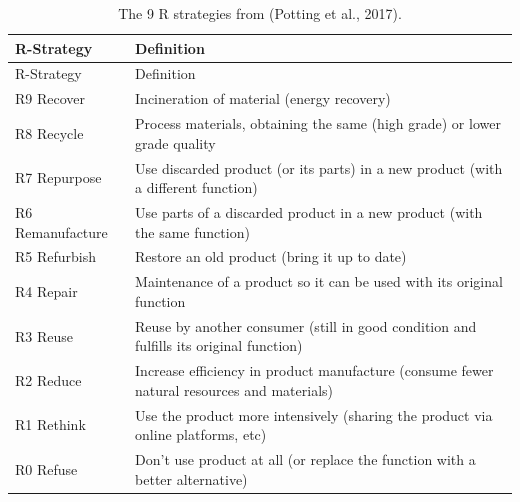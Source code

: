 \documentclass[
  12pt,
  letterpaper,
  DIV=11,
  numbers=noendperiod]{scrartcl}
\begin{document}
\begin{longtable}[]{@{}
  >{\raggedright\arraybackslash}p{}
  >{\raggedright\arraybackslash}p{}@{}}
\caption[The R Strategies]{The 9 R strategies from (Potting et al.,
2017).}\tabularnewline
\toprule\noalign{}
\begin{minipage}[b]{\linewidth}\raggedright
R-Strategy
\end{minipage} & \begin{minipage}[b]{\linewidth}\raggedright
Definition
\end{minipage} \\
\midrule\noalign{}
\endfirsthead
\toprule\noalign{}
\begin{minipage}[b]{\linewidth}\raggedright
R-Strategy
\end{minipage} & \begin{minipage}[b]{\linewidth}\raggedright
Definition
\end{minipage} \\
\midrule\noalign{}
\endhead
\bottomrule\noalign{}
\endlastfoot
R9 Recover & Incineration of material (energy recovery) \\
R8 Recycle & Process materials, obtaining the same (high grade) or lower
grade quality \\
R7 Repurpose & Use discarded product (or its parts) in a new product
(with a different function) \\
R6 Remanufacture & Use parts of a discarded product in a new product
(with the same function) \\
R5 Refurbish & Restore an old product (bring it up to date) \\
R4 Repair & Maintenance of a product so it can be used with its original
function \\
R3 Reuse & Reuse by another consumer (still in good condition and
fulfills its original function) \\
R2 Reduce & Increase efficiency in product manufacture (consume fewer
natural resources and materials) \\
R1 Rethink & Use the product more intensively (sharing the product via
online platforms, etc) \\
R0 Refuse & Don't use product at all (or replace the function with a
better alternative) \\
\end{longtable}

\let\pandoctableshortcapt\relax
\end{document}
